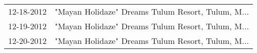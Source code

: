 \begin{supertabular}{ll}
 12-18-2012 &  "Mayan Holidaze" Dreams Tulum Resort, Tulum, M... \\
 12-19-2012 &  "Mayan Holidaze" Dreams Tulum Resort, Tulum, M... \\
 12-20-2012 &  "Mayan Holidaze" Dreams Tulum Resort, Tulum, M... \\
\end{supertabular}
